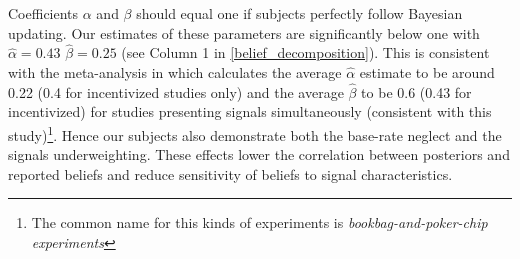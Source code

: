 \documentclass[12pt,a4paper]{article}
\begin{document}
Coefficients $\alpha$ and $\beta$ should equal one if subjects perfectly follow Bayesian updating. Our estimates of these parameters are significantly below one with $\hat \alpha=0.43$ $\hat \beta=0.25$ (see Column 1 in \ref{belief_decomposition}). This is consistent with the meta-analysis in \citet{benjamin_chapter_2019} which calculates the average $\hat \alpha$ estimate to be around 0.22 (0.4 for incentivized studies only) and the average $\hat \beta$ to be 0.6 (0.43 for incentivized) for studies presenting signals simultaneously (consistent with this study)\footnote{The common name for this kinds of experiments is \textit{bookbag-and-poker-chip experiments}}. Hence our subjects also demonstrate both the base-rate neglect and the signals underweighting. These effects lower the correlation between posteriors and reported beliefs and reduce sensitivity of beliefs to signal characteristics.  


\end{document}
